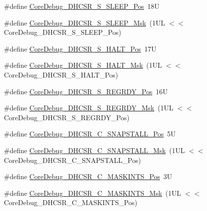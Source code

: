 \begin{DoxyCompactItemize}
\item 
\#define \mbox{\hyperlink{group___c_m_s_i_s___core_debug_ga349ccea33accc705595624c2d334fbcb}{Core\+Debug\+\_\+\+D\+H\+C\+S\+R\+\_\+\+S\+\_\+\+S\+L\+E\+E\+P\+\_\+\+Pos}}~18U
\item 
\#define \mbox{\hyperlink{group___c_m_s_i_s___core_debug_ga98d51538e645c2c1a422279cd85a0a25}{Core\+Debug\+\_\+\+D\+H\+C\+S\+R\+\_\+\+S\+\_\+\+S\+L\+E\+E\+P\+\_\+\+Msk}}~(1\+U\+L $<$$<$ Core\+Debug\+\_\+\+D\+H\+C\+S\+R\+\_\+\+S\+\_\+\+S\+L\+E\+E\+P\+\_\+\+Pos)
\item 
\#define \mbox{\hyperlink{group___c_m_s_i_s___core_debug_ga760a9a0d7f39951dc3f07d01f1f64772}{Core\+Debug\+\_\+\+D\+H\+C\+S\+R\+\_\+\+S\+\_\+\+H\+A\+L\+T\+\_\+\+Pos}}~17U
\item 
\#define \mbox{\hyperlink{group___c_m_s_i_s___core_debug_ga9f881ade3151a73bc5b02b73fe6473ca}{Core\+Debug\+\_\+\+D\+H\+C\+S\+R\+\_\+\+S\+\_\+\+H\+A\+L\+T\+\_\+\+Msk}}~(1\+U\+L $<$$<$ Core\+Debug\+\_\+\+D\+H\+C\+S\+R\+\_\+\+S\+\_\+\+H\+A\+L\+T\+\_\+\+Pos)
\item 
\#define \mbox{\hyperlink{group___c_m_s_i_s___core_debug_ga20a71871ca8768019c51168c70c3f41d}{Core\+Debug\+\_\+\+D\+H\+C\+S\+R\+\_\+\+S\+\_\+\+R\+E\+G\+R\+D\+Y\+\_\+\+Pos}}~16U
\item 
\#define \mbox{\hyperlink{group___c_m_s_i_s___core_debug_gac4cd6f3178de48f473d8903e8c847c07}{Core\+Debug\+\_\+\+D\+H\+C\+S\+R\+\_\+\+S\+\_\+\+R\+E\+G\+R\+D\+Y\+\_\+\+Msk}}~(1\+U\+L $<$$<$ Core\+Debug\+\_\+\+D\+H\+C\+S\+R\+\_\+\+S\+\_\+\+R\+E\+G\+R\+D\+Y\+\_\+\+Pos)
\item 
\#define \mbox{\hyperlink{group___c_m_s_i_s___core_debug_ga85747214e2656df6b05ec72e4d22bd6d}{Core\+Debug\+\_\+\+D\+H\+C\+S\+R\+\_\+\+C\+\_\+\+S\+N\+A\+P\+S\+T\+A\+L\+L\+\_\+\+Pos}}~5U
\item 
\#define \mbox{\hyperlink{group___c_m_s_i_s___core_debug_ga53aa99b2e39a67622f3b9973e079c2b4}{Core\+Debug\+\_\+\+D\+H\+C\+S\+R\+\_\+\+C\+\_\+\+S\+N\+A\+P\+S\+T\+A\+L\+L\+\_\+\+Msk}}~(1\+U\+L $<$$<$ Core\+Debug\+\_\+\+D\+H\+C\+S\+R\+\_\+\+C\+\_\+\+S\+N\+A\+P\+S\+T\+A\+L\+L\+\_\+\+Pos)
\item 
\#define \mbox{\hyperlink{group___c_m_s_i_s___core_debug_ga0d2907400eb948a4ea3886ca083ec8e3}{Core\+Debug\+\_\+\+D\+H\+C\+S\+R\+\_\+\+C\+\_\+\+M\+A\+S\+K\+I\+N\+T\+S\+\_\+\+Pos}}~3U
\item 
\#define \mbox{\hyperlink{group___c_m_s_i_s___core_debug_ga77fe1ef3c4a729c1c82fb62a94a51c31}{Core\+Debug\+\_\+\+D\+H\+C\+S\+R\+\_\+\+C\+\_\+\+M\+A\+S\+K\+I\+N\+T\+S\+\_\+\+Msk}}~(1\+U\+L $<$$<$ Core\+Debug\+\_\+\+D\+H\+C\+S\+R\+\_\+\+C\+\_\+\+M\+A\+S\+K\+I\+N\+T\+S\+\_\+\+Pos)
$$
\end{DoxyCompactItemize}
